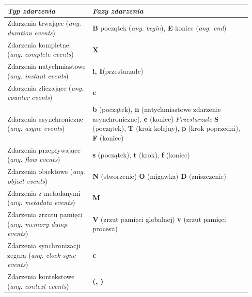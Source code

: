 \documentclass[polish, twoside, 12pt]{mwart}
\begin{document}
\begin{center}
  \begin{tabularx}{\textwidth}{|X|X|}\hline
    \emph{Typ zdarzenia} & \emph{Fazy zdarzenia}\\ \hline
    Zdarzenia trwające (\emph{ang. duration events}) & \textbf{B} początek (\emph{ang. begin}),\newline
    \textbf{E} koniec (\emph{ang. end})\\ \hline
    Zdarzenia kompletne (\emph{ang. complete events}) & \textbf{X}\\ \hline
    Zdarzenia natychmiastowe (\emph{ang. instant events}) & \textbf{i, I}(przestarzałe)\\ \hline
    Zdarzenia zliczające (\emph{ang. counter events}) & \textbf{c}\\ \hline
    Zdarzenia asynchroniczne (\emph{ang. async events}) & \textbf{b} (początek),\newline
    \textbf{n} (natychmiastowe zdarzenie asynchroniczne),\newline
    \textbf{e} (koniec)\newline\newline
    \textit{Przestarzałe}\newline
    \textbf{S} (początek),\newline
    \textbf{T} (krok kolejny),\newline
    \textbf{p} (krok poprzedni),\newline
    \textbf{F} (koniec)\\ \hline
    Zdarzenia przepływające (\emph{ang. flow events}) & \textbf{s} (początek),\newline
    \textbf{t} (krok),\newline
    \textbf{f} (koniec)\\ \hline
    Zdarzenia obiektowe (\emph{ang. object events}) & \textbf{N} (stworzenie)\newline
    \textbf{O} (migawka)\newline
    \textbf{D} (zniszczenie)\\ \hline
    Zdarzenia z metadanymi (\emph{ang. metadata events}) & \textbf{M}\\ \hline
    Zdarzenia zrzutu pamięci (\emph{ang. memory dump events}) & \textbf{V} (zrzut pamięci globalnej)\newline
    \textbf{v} (zrzut pamięci procesu)\\ \hline
    Zdarzenia synchronizacji zegara (\emph{ang. clock sync events}) & \textbf{c}\\ \hline
    Zdarzenia kontekstowe (\emph{ang. context events}) & \textbf{(, )}\\ \hline
  \end{tabularx}
\end{center}
\end{document}
